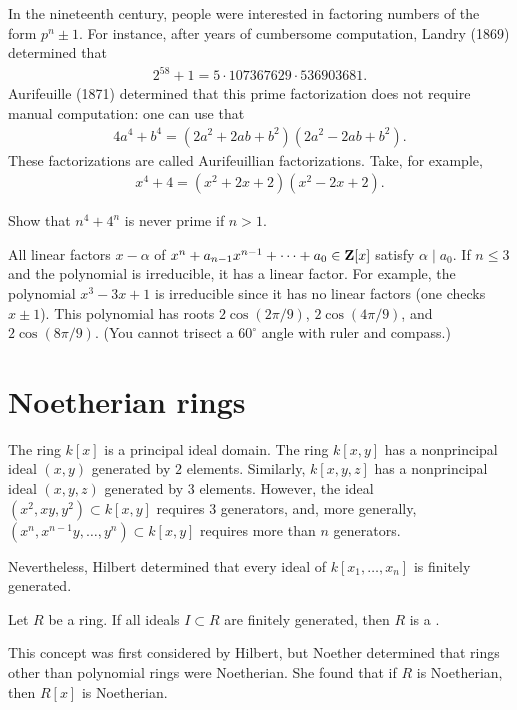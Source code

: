\documentclass[11pt, oneside,margin=1in]{article}
\begin{document}
In the nineteenth century, people were interested in factoring numbers of the form $p^n \pm 1$. For instance, after years of cumbersome computation, Landry (1869) determined that
\begin{align*}
	2^{58} + 1 = 5\cdot 107367629 \cdot 536903681.
\end{align*}
Aurifeuille (1871) determined that this prime factorization does not require manual computation: one can use that
 \begin{align*}
	4a^4 + b^4 = (2a^2+2ab + b^2) (2a^2-2ab+b^2).
\end{align*}
These factorizations are called Aurifeuillian factorizations. Take, for example,
\begin{align*}
	x^4 + 4 = (x^2+2x+2) (x^2-2x+2).
\end{align*}
\begin{exercise}\label{}
Show that $n^4 + 4^n$ is never prime if $n>1$.
\end{exercise}

All linear factors $x-\alpha$ of $x^n + a_{n-1}x^{n-1} +\cdots + a_0\in \mathbf Z[x]$ satisfy $\alpha \mid a_0$. If $n\le 3$ and the polynomial is irreducible, it has a linear factor. For example, the polynomial $x^3 - 3x +1$ is irreducible since it has no linear factors (one checks $x\pm 1$). This polynomial has roots $2\cos (2\pi/9)$, $2\cos (4\pi/9)$, and $2\cos(8\pi/9)$. (You cannot trisect a $60^\circ$ angle with ruler and compass.)

\section{Noetherian rings}
The ring $k[x]$ is a principal ideal domain. The ring $k[x,y]$ has a nonprincipal ideal $(x,y)$ generated by $2$ elements. Similarly, $k[x,y,z]$ has a nonprincipal ideal $(x,y,z)$ generated by $3$ elements. However, the ideal $(x^2, xy, y^2) \subset k[x,y]$ requires $3$ generators, and, more generally, $(x^n, x^{n-1} y ,\hdots, y^n)\subset k[x,y]$ requires more than $n$ generators. 

Nevertheless, Hilbert determined that every ideal of $k[x_1,\hdots, x_n]$ is finitely generated. 

\begin{definition}[ ]\label{}
Let $R$ be a ring. If all ideals $I\subset R$ are finitely generated, then $R$ is a .
\end{definition}

This concept was first considered by Hilbert, but Noether determined that rings other than polynomial rings were Noetherian. She found that if $R$ is Noetherian, then $R[x]$ is Noetherian.
\end{document}
